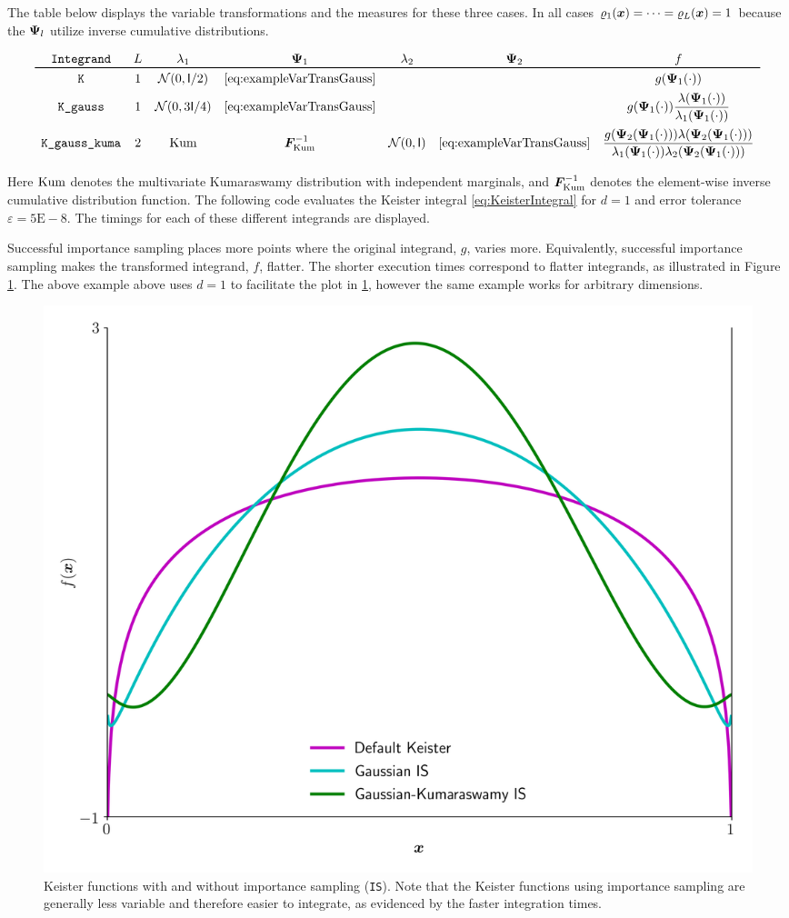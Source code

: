 \documentclass[graybox,footinfo]{svmult}
\newcommand{\mI}{\mathsf{I}}
\newcommand{\Kum}{\textup{Kum}}
\begin{document}
The table below displays the variable transformations and the measures for these three cases.  In all cases $\varrho_1({\boldsymbol{x}}) = \cdots = \varrho_L({\boldsymbol{x}}) = 1$ because the ${\boldsymbol{\Psi}}_l$ utilize inverse cumulative distributions.

\[\begin{array}{ccccccc}
	\texttt{Integrand} & L & \lambda_1 & \bsPsi_1 & \lambda_2 & \bsPsi_2 & f \tabularnewline
	\toprule
	\texttt{K} & 1 & \calN(0, \mI/2) & \eqref{eq:exampleVarTransGauss}& && g(\bsPsi_1(\cdot)) \tabularnewline [1ex]
	\texttt{K\_gauss} & 1 & \calN(0,3 \mI/4) & \eqref{eq:exampleVarTransGauss} & && 
	\displaystyle g(\bsPsi_1(\cdot)) \frac{\lambda(\bsPsi_1(\cdot))}{\lambda_1(\bsPsi_1(\cdot))} \tabularnewline [2.5ex]
	\texttt{K\_gauss\_kuma} & 2 & \Kum & \bsF^{-1}_\Kum & \calN(0,\mI) &  \eqref{eq:exampleVarTransGauss} &
	\displaystyle \frac{g(\bsPsi_2(\bsPsi_1(\cdot))) \lambda(\bsPsi_2(\bsPsi_1(\cdot))) }{\lambda_1(\bsPsi_1(\cdot)) \lambda_2(\bsPsi_2(\bsPsi_1(\cdot)))} 
\end{array}
\]

Here $\Kum$ denotes the multivariate Kumaraswamy distribution with independent marginals, and $ \boldsymbol{F}^{-1}_\Kum$ denotes the element-wise inverse cumulative distribution function.  The following code evaluates the Keister integral \eqref{eq:KeisterIntegral} for $d=1$ and error tolerance $\varepsilon = 5\text{E}-8$.  The timings for each of these different integrands are displayed.



Successful importance sampling places more points where the original integrand, $g$, varies more.  Equivalently, successful importance sampling makes the transformed integrand, $f$, flatter. The shorter execution times correspond to flatter integrands, as  illustrated in Figure \ref{fig:mIS}. The above example above uses $d=1$ to facilitate the plot in \ref{fig:mIS}, however the same example works for arbitrary dimensions.
\begin{figure}
    \centering
	\includegraphics[width=.8\textwidth]{QMCSoftwareArticle/figs/multiple_IS.png}
	\caption{Keister functions with and without importance sampling (\texttt{IS}). Note that the Keister functions using importance sampling are generally less variable and therefore easier to integrate, as evidenced by the faster integration times.} \label{fig:mIS}
\end{figure}
\end{document}
